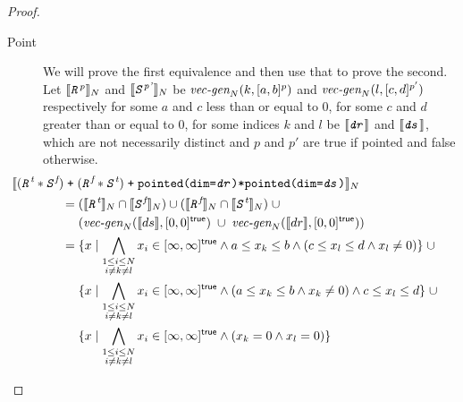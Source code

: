 \documentclass{article}
\theoremstyle{definition}
\theoremstyle{plain}
\theoremstyle{remark}
\newcommand{\interp}[1]{\llbracket {#1} \rrbracket}
\newcommand{\interv}[3]{\textnormal{$\lbrack#1,#2\rbrack^{#3}$}}
\newcommand{\vecgen}[3]{\textnormal{$\textit{vec-gen}_{#1}(#2,#3)$}}
\newcommand{\textcap}[1]{\texttt{\textit{#1}}}
\begin{document}
\begin{proof}
\begin{description}
    \item[Point] We will prove the first equivalence and then use that to prove
      the second.
%
      Let $\interp{\textcap{R}^{\textnormal{\textit{p}}}}_N$ and
      $\interp{\textcap{S}^{\textnormal{\textit{p'}}}}_N$ be
      $\vecgen{N}{k}{\interv{a}{b}{p}}$ and $\vecgen{N}{l}{\interv{c}{d}{p'}}$
      respectively for some $a$ and $c$ less than or equal to 0, for some $c$
      and $d$ greater than or equal to 0, for some indices $k$ and $l$ be
      $\interp{\textcap{dr}}$ and $\interp{\textcap{ds}}$, which are not
      necessarily distinct and $p$ and $p'$ are \textsf{true} if pointed and
      \textsf{false} otherwise.
%
      \begin{align*}
        \hspace{2em&\hspace{-2em}}
        \interp
          {{(\textcap{R}^{\textit{t}} * \textcap{S}^{\textit{f}})}
           \;\texttt{+}\;
           {(\textcap{R}^{\textit{f}} * \textcap{S}^{\textit{t}})}
           \;\texttt{+}\;
           \texttt{pointed(dim=\textcap{dr})*pointed(dim=\textcap{ds})}}_N \\
        & = {(\interp{\textcap{R}^{\textit{t}}}_N \cap
              \interp{\textcap{S}^{\textit{f}}}_N)} \cup
            {(\interp{\textcap{R}^{\textit{f}}}_N \cap
              \interp{\textcap{S}^{\textit{t}}}_N)} \;\cup \\
        & \quad\,\, {(\vecgen{N}{\interp{ds}}{\interv{0}{0}{\textsf{true}}}
                      \;\cup\;
                      \vecgen{N}{\interp{dr}}{\interv{0}{0}{\textsf{true}}})} \\
        & = \{ x \mid
            \bigwedge_{\substack{1 \leq i \leq N \\ i \neq k \neq l}} x_i \in
              \interv{\infty}{\infty}{\textsf{true}}
            \wedge a \leq x_k \leq b
            \wedge {(c \leq x_l \leq d \wedge x_l \neq 0)} \} \;\cup \\
        & \quad\,\, \{ x \mid
            \bigwedge_{\substack{1 \leq i \leq N \\ i \neq k \neq l}} x_i \in
              \interv{\infty}{\infty}{\textsf{true}}
            \wedge {(a \leq x_k \leq b \wedge x_k \neq 0)}
            \wedge c \leq x_l \leq d \} \;\cup \\
        & \quad\,\, \{ x \mid
            \bigwedge_{\substack{1 \leq i \leq N \\ i \neq k \neq l}} x_i \in
              \interv{\infty}{\infty}{\textsf{true}}
            \wedge (x_k = 0 \wedge x_l = 0) \} \\

\end{align*}
\end{description}
\end{proof}
\end{document}
